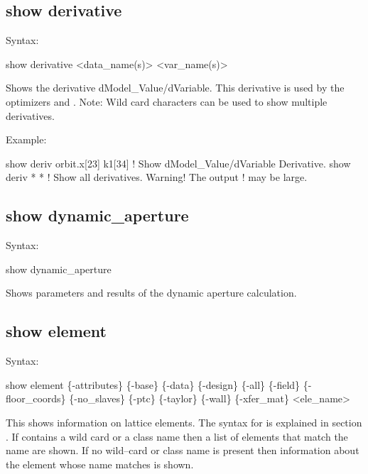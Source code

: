 {{{{{%

\subsection{show derivative}
\label{s:show.derivative}

Syntax:
\begin{example}
  show derivative <data_name(s)> <var_name(s)>
\end{example}


Shows the derivative dModel_Value/dVariable. This derivative is used by the optimizers
 and . Note: Wild card characters can be used to show multiple derivatives.

Example:
\begin{example}
  show deriv orbit.x[23] k1[34] ! Show dModel_Value/dVariable Derivative.
  show deriv * *                ! Show all derivatives. Warning! The output 
                                ! may be large.
\end{example}


\subsection{show dynamic_aperture}
\label{s:show.dynamic}

Syntax:
\begin{example}
  show dynamic_aperture
\end{example}


Shows parameters and results of the dynamic aperture calculation.


\subsection{show element}
\label{s:show.element}

Syntax:
\begin{example}
  show element \{-attributes\} \{-base\} \{-data\} \{-design\} \{-all\} \{-field\}
      \{-floor_coords\} \{-no_slaves\} \{-ptc\} \{-taylor\} \{-wall\} \{-xfer_mat\} <ele_name>
\end{example}

This shows information on lattice elements. The syntax for  is explained in
section . If  contains a wild card or a class name
then a list of elements that match the name are shown. If no wild--card or class name is
present then information about the element whose name matches  is shown.

}}}}}
